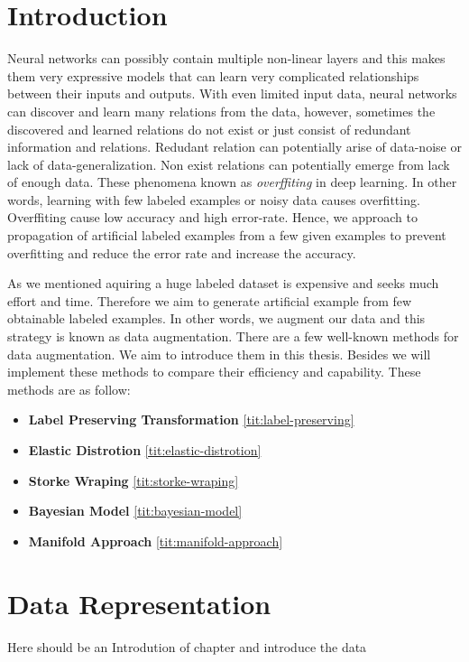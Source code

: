 \chapter{Introduction}

Neural networks can possibly contain multiple non-linear layers and this makes them very expressive models
that can learn very complicated relationships between their inputs and outputs. With even limited
input data, neural networks can discover and learn many relations from the data, however, sometimes the
discovered and learned relations do not exist or just consist of redundant information and
relations. Redudant relation can potentially arise of data-noise or lack of data-generalization. Non
exist relations can potentially emerge from lack of enough data. These phenomena known as
\textit{overffiting} in deep learning. In other words, learning with few labeled examples or noisy
data causes overfitting. Overffiting cause low accuracy and high error-rate. Hence, we approach to propagation of artificial
labeled examples from a few given examples to prevent overfitting and reduce the error rate and increase
the accuracy.

As we mentioned aquiring a huge labeled dataset is expensive and seeks much effort and time. Therefore we aim to generate artificial example from few obtainable labeled examples. In other words, we
augment our data and this strategy is known as data augmentation. There are a few well-known methods for data augmentation. We aim to introduce them in this thesis.  Besides we will implement these
methods to compare their efficiency and capability. These methods are as follow:
\begin{itemize}
  \item \textbf{Label Preserving Transformation} \ref{tit:label-preserving}
  \item \textbf{Elastic Distrotion} \ref{tit:elastic-distrotion}
  \item \textbf{Storke Wraping} \ref{tit:storke-wraping}
  \item \textbf{Bayesian Model} \ref{tit:bayesian-model}
  \item \textbf{Manifold Approach} \ref{tit:manifold-approach}
\end{itemize}



\chapter{Data Representation}
Here should be an Introdution of chapter and introduce the data

